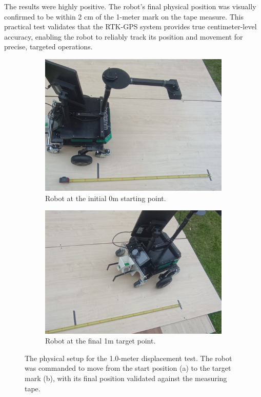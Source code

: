 The results were highly positive. The robot's final physical position was visually confirmed to be within 2 cm of the 1-meter mark on the tape measure. This practical test validates that the RTK-GPS system provides true centimeter-level accuracy, enabling the robot to reliably track its position and movement for precise, targeted operations.

\begin{figure}[h!]
    \centering
    \begin{subfigure}[b]{0.49\textwidth}
        \centering
        \includegraphics[width=\textwidth]{figures/rtk_test_1.PNG} 
        \caption{Robot at the initial 0m starting point.}
        \label{fig:start_pos_sub}
    \end{subfigure}
    \hfill 
    \begin{subfigure}[b]{0.49\textwidth}
        \centering
        \includegraphics[width=\textwidth]{figures/rtk_test_2.PNG} 
        \caption{Robot at the final 1m target point.}
        \label{fig:end_pos_sub}
    \end{subfigure}
    \caption[One-Meter Positional Accuracy Test.]
    {The physical setup for the 1.0-meter displacement test. The robot was commanded to move from the start position (a) to the target mark (b), with its final position validated against the measuring tape.}
    \label{fig:1m_test}
\end{figure}



